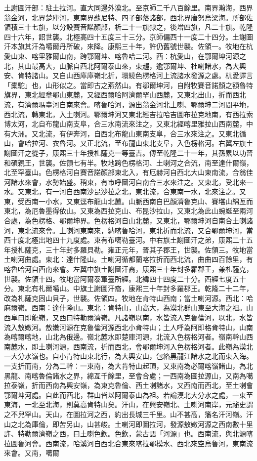 \begin{pinyinscope}
土謝圖汗部：駐土拉河。直大同邊外漠北。至京師二千八百餘里。南界瀚海，西界翁金河，北界楚庫河，東南界蘇尼特、四子部落諸部，西北界唐努烏梁海。所部佐領積三十七旗，以分設賽音諾顏部，析二十一旗隸之，後增四旗，凡二十旗。乾隆四十六年，詔世襲。北極高四十五度三十三分。京師偏西十一度二十四分。土謝圖汗本旗其汗為噶爾丹所破，來降。康熙三十年，許仍舊號世襲。佐領一。牧地在杭愛山東、喀里雅爾山南，跨鄂爾坤、喀魯哈二河。西：杭愛山，在鄂爾坤河源之北，其山最高大，山脈自西北阿爾泰山來，東趨，逾鄂爾坤、杜喇諸水，為大興安、肯特諸山。又自山西庫庫嶺北折，環繞色楞格河上流諸水發源之處。杭愛譯言「橐駝」也，山形似之。當即古之燕然山。有鄂爾坤河，自附牧賽音諾顏之額魯特旗界，東北經章鄂山東麓，又經西爾哈阿濟爾罕山西麓，又東北出山，折而西北流，有濟爾瑪臺河自南來會。喀魯哈河，源出翁金河北土喇、鄂爾坤二河間平地，西北流，轉東北，入土喇河。鄂爾坤河又東北經吉拉哈吉圖布拉克地南，有西拉索博太河，北自布龍山南支阜，合三水南流來注之，又東北經喀里雅拉山西南麓，中有大洲。又北流，有伊奔河，自西北布龍山東南支阜，合三水來注之。又東北循山，會哈拉河、衣魯河。又正北流，至布龍山東北支阜，入色楞格河。右翼左旗土謝圖汗之從子，康熙三十年授札薩克一等臺吉。傳至乾隆二十一年，其孫累以功晉和碩親王，世襲。佐領七有半。牧地跨色楞格河、土喇河之合流，南至達什爾嶺，北至罕臺山。色楞格河自賽音諾顏部東北入，有厄赫河自西北大山東南流，合翁佳河諸水來會，水勢始盛。稍東，有市呼圖河自南合三水來注之。又東北，受北來一水。又東北，有一河自西南沙昆沙拉之北，東北流，合東南一水，北來注之。又東，受西南一小水，又東逕布龍山北麓。山脈西南自巴顏濟魯克山、賽堪山綿亙而東北，為厄魯墨得依山。又東為西拉克山、布昆沙拉山，又東北為此山蜿蜒至兩河合處，為色楞格、鄂爾坤界。色楞格河自山北麓，又東北，鄂爾坤河自南合土喇諸河，東北流來會。土喇河東南來，納喀魯哈河，東北折而北流，又合鄂爾坤河，當西十度北極出地四十九度處。東有布噶勒臺河。中右旗土謝圖汗之弟，康熙二十五年授札薩克，三十年封多羅貝勒。雍正元年，晉其子郡王，世襲。佐領三。牧地當土喇河曲處。東北：達什隆山。土喇河循都蘭喀拉折而西北流，曲曲四百餘里，有喀魯哈河自西南來會。左翼中旗土謝圖汗裔，康熙三十年封多羅郡王，兼札薩克，世襲。佐領十四。牧地當阿爾泰軍臺所經。北緯四十四度二十分。西經七度五十分。東北有札爾噶山。中旗土謝圖汗裔，康熙三十年封多羅郡王。乾隆二十二年，改為札薩克固山貝子，世襲。佐領四。牧地在肯特山西南；當土喇河源。西北：哈麻爾嶺。西南：達什隆山。東北：肯特山，山高大，為漠北群山東至大海之祖。山西阜曰即龍嶺，又西曰特勒爾濟嶺。凡諸嶺以南，水皆流入克魯倫河，以北，水皆流入敖嫩河。敖嫩河源在克魯倫河源西北小肯特山；土人呼為阿即格肯特山，山南為喀爾喀地，山北為俄邊。嶺北麓水即楚庫河源，北流入色楞格河者。嶺南幹山西南麓水，即土喇河源，西南流，折而西北，會鄂爾坤河入色楞格河者。此嶺為漠北一大分水嶺也。自小肯特山東北行，為大興安山，包絡黑龍江諸水之北而東入海。一支折而南，分為二幹：一東南，為大肯特山起頂，又東南為必爾喀嶺諸山，為北黑龍、南喀魯倫諸水之界，綿亙千餘里，至會合處；一西南為圖拉源山，又南為噶拉泰嶺，折而西南為興安嶺，為東克魯倫、西土喇諸水，又西南而西北，至土喇會鄂爾坤河處。自此而西北，群山皆以阿爾泰山為祖。若論漠北大分水之處，一東至東海，一北至北海，則莫高肯特山矣。汗山，在興安嶺北、土喇河南岸，元祕史謂之不兒罕山。天山，在圖拉河之西，約出長城三千里。山不甚高，籓名汗河嶺。汗山之北為庫倫，即苦另山，山甚峻。土喇河即圖拉河，發源敖嫩河源之西南數十里許、特勒爾濟嶺之西，曰土喇色欽。色欽，蒙古語「河源」也。西南流，與北源喀拉圖魯河會。西南流，哈溪河自西北合東來喀拉鄂模水、西北來空烏魯河，東南流來會。又南，噶爾
\end{pinyinscope}
